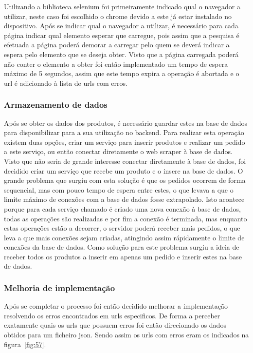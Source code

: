 Utilizando a biblioteca selenium foi primeiramente indicado qual o navegador a utilizar, neste caso foi escolhido o chrome devido a este já estar instalado
no dispositivo. Após se indicar qual o navegador a utilizar, é necessário para cada página indicar qual elemento esperar que carregue, pois assim que a pesquisa
é efetuada a página poderá demorar a carregar pelo quem se deverá indicar a espera pelo elemento que se deseja obter. Visto que a página carregada poderá não
conter o elemento a obter foi então implementado um tempo de espera máximo de 5 segundos, assim que este tempo expira a operação é abortada e o url é adicionado
à lista de urls com erros.

\newpage

\subsubsection{Armazenamento de dados}

Após se obter os dados dos produtos, é necessário guardar estes na base de dados para disponibilizar para a sua utilização no backend. Para realizar
esta operação existem duas opções, criar um serviço para inserir produtos e realizar um pedido a este serviço, ou então conectar diretamente
o web scraper à base de dados. Visto que não seria de grande interesse conectar diretamente à base de dados, foi decidido criar um serviço que recebe um produto e o 
insere na base de dados. O grande problema que surgiu com esta solução é que os pedidos ocorrem de forma sequencial, mas com pouco tempo de espera entre estes, o que
levava a que o limite máximo de conexões com a base de dados fosse extrapolado. Isto acontece porque para cada serviço chamado é criado uma nova conexão à base de 
dados, todas as operações são realizadas e por fim a conexão é terminada, mas enquanto estas operações estão a decorrer, o servidor poderá receber mais pedidos, o que 
leva a que mais conexões sejam criadas, atingindo assim rápidamente o limite de conexões da base de dados. Como solução para este problema surgiu a ideia de receber todos
os produtos a inserir em apenas um pedido e inserir estes na base de dados.

\subsubsection{Melhoria de implementação}

Após se completar o processo foi então decidido melhorar a implementação resolvendo os erros encontrados em urls especificos. De forma a perceber exatamente quais os urls
que possuem erros foi então direcionado os dados obtidos para um ficheiro json. Sendo assim os urls com erros eram os indicados na figura~\ref{fig:57}.

